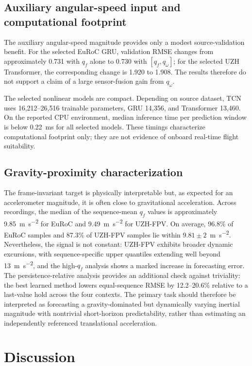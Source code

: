 \documentclass[preprint,12pt]{elsarticle}
\newcommand{\qf}{q_f}
\newcommand{\qw}{q_\omega}
\begin{document}
\subsection{Auxiliary angular-speed input and computational footprint}

The auxiliary angular-speed magnitude provides only a modest source-validation benefit. For the selected EuRoC GRU, validation RMSE changes from approximately 0.731 with $\qf$ alone to 0.730 with $[\qf,\qw]$; for the selected UZH Transformer, the corresponding change is 1.920 to 1.908. The results therefore do not support a claim of a large sensor-fusion gain from $\qw$.

The selected nonlinear models are compact. Depending on source dataset, TCN uses 16,212--26,516 trainable parameters, GRU 14,356, and Transformer 13,460. On the reported CPU environment, median inference time per prediction window is below \SI{0.22}{\milli\second} for all selected models. These timings characterize computational footprint only; they are not evidence of onboard real-time flight suitability.

\subsection{Gravity-proximity characterization}

The frame-invariant target is physically interpretable but, as expected for an accelerometer magnitude, it is often close to gravitational acceleration. Across recordings, the median of the sequence-mean $\qf$ values is approximately \SI{9.85}{\metre\per\second\squared} for EuRoC and \SI{9.49}{\metre\per\second\squared} for UZH-FPV. On average, 96.8\% of EuRoC samples and 87.3\% of UZH-FPV samples lie within $9.81\pm2$~\si{\metre\per\second\squared}. Nevertheless, the signal is not constant: UZH-FPV exhibits broader dynamic excursions, with sequence-specific upper quantiles extending well beyond \SI{13}{\metre\per\second\squared}, and the high-$\qf$ analysis shows a marked increase in forecasting error. The persistence-relative analysis provides an additional check against triviality: the best learned method lowers equal-sequence RMSE by 12.2--20.6\% relative to a last-value hold across the four contexts. The primary task should therefore be interpreted as forecasting a gravity-dominated but dynamically varying inertial magnitude with nontrivial short-horizon predictability, rather than estimating an independently referenced translational acceleration.

\section{Discussion}
\label{sec:discussion}
\end{document}
